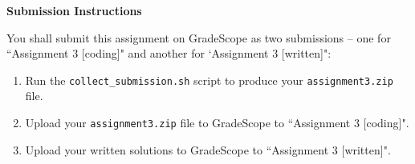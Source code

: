 \Large{\textbf{Submission Instructions}}

\normalsize
You shall submit this assignment on GradeScope as two submissions -- one for ``Assignment 3 [coding]" and another for `Assignment 3 [written]":
\begin{enumerate}
    \item Run the \texttt{collect\_submission.sh} script to produce your \texttt{assignment3.zip} file.
    \item Upload your \texttt{assignment3.zip} file to GradeScope to ``Assignment 3 [coding]".
    \item Upload your written solutions to GradeScope to ``Assignment 3 [written]".
\end{enumerate}